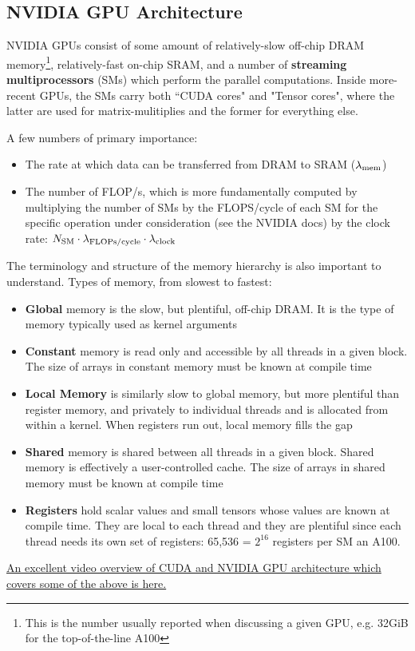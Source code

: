 \documentclass[11pt]{article}
\begin{document}
\subsection{NVIDIA GPU Architecture}

NVIDIA GPUs consist of some amount of relatively-slow off-chip DRAM memory\footnote{This is the number usually reported when
	discussing a given GPU, e.g. 32GiB for the top-of-the-line A100}, relatively-fast on-chip SRAM, and
a number of \textbf{streaming multiprocessors} (SMs) which perform the parallel computations.  Inside
more-recent GPUs, the SMs carry both ``CUDA cores" and "Tensor cores", where the latter are used for matrix-mulitiplies
and the former for everything else.


A few numbers of primary importance:
\begin{itemize}
	\item The rate at which data can be transferred from DRAM to SRAM ($ \lambda _{ {\rm mem} } $)
	\item The number of FLOP/s, which is more fundamentally computed by multiplying the number of
	      SMs by the FLOPS/cycle of each SM for the specific operation under consideration (see the NVIDIA
	      docs) by the clock rate: $ N _{ {\rm SM} }\cdot  \lambda _{ {\rm FLOPs/cycle} }\cdot  \lambda _{
			      {\rm clock} } $
\end{itemize}

The terminology and structure of the memory hierarchy is also important to understand. Types of
memory, from slowest to fastest:
\begin{itemize}
	\item \textbf{Global} memory is the slow, but plentiful, off-chip DRAM. It is the type of memory
	      typically used as kernel arguments
	\item \textbf{Constant} memory is read only and accessible by all threads in a given block. The
	      size of arrays in constant memory must be known at compile time
	\item \textbf{Local Memory} is similarly slow to global memory, but more plentiful than register
	      memory, and privately to individual threads and is allocated from within a kernel. When
	      registers run out, local memory fills the gap
	\item \textbf{Shared} memory is shared between all threads in a given block. Shared memory is
	      effectively a user-controlled cache. The size of arrays in shared memory must  be known at
	      compile time
	\item \textbf{Registers} hold scalar values and small tensors whose values are known at compile
	      time. They are local to each thread and they are plentiful since each thread needs its own
	      set of registers: 65,536 = $ 2 ^{ 16 } $ registers per SM an A100.
\end{itemize}
\href{https://www.youtube.com/watch?v=QQceTDjA4f4&t=2124s}{An excellent video overview of CUDA and NVIDIA GPU architecture which covers some of the above is here.}
\end{document}
